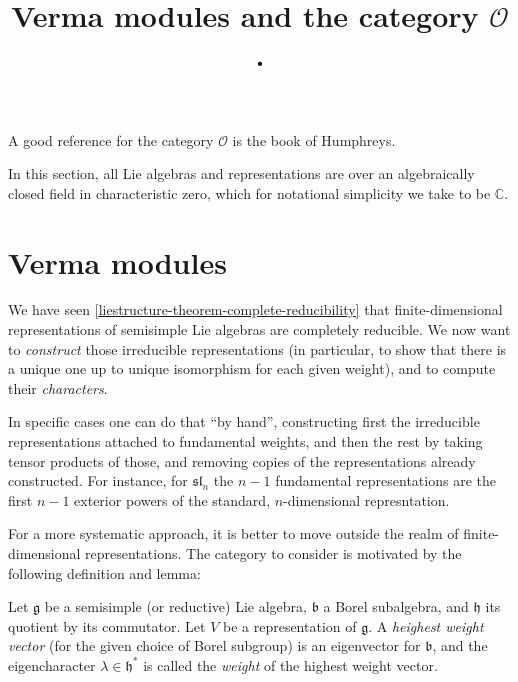 

%


\title{Verma modules and the category $\mathcal O$.}


\maketitle

\label{section-phantom}


\tableofcontents

A good reference for the category $\mathcal O$ is the book \cite{Humphreys-O} of Humphreys.


In this section, all Lie algebras and representations are over an algebraically closed field in characteristic zero, which for notational simplicity we take to be $\mathbb C$.


\section{Verma modules}
\label{section-Verma-modules}
We have seen \ref{liestructure-theorem-complete-reducibility} that finite-dimensional representations of semisimple Lie algebras are completely reducible. We now want to \emph{construct} those irreducible representations (in particular, to show that there is a unique one up to unique isomorphism for each given weight), and to compute their \emph{characters}.

In specific cases one can do that ``by hand'', constructing first the irreducible representations attached to fundamental weights, and then the rest by taking tensor products of those, and removing copies of the representations already constructed. For instance, for $\mathfrak{sl}_n$ the $n-1$ fundamental representations are the first $n-1$ exterior powers of the standard, $n$-dimensional represntation.

For a more systematic approach, it is better to move outside the realm of finite-dimensional representations. The category to consider is motivated by the following definition and lemma:
\begin{definition}
 \label{definition-highest-weight}
 Let $\mathfrak g$ be a semisimple (or reductive) Lie algebra, $\mathfrak b$ a Borel subalgebra, and $\mathfrak h$ its quotient by its commutator. Let $V$ be a representation of $\mathfrak g$. A {\it heighest weight vector} (for the given choice of Borel subgroup) is an eigenvector for $\mathfrak b$, and the eigencharacter $\lambda\in\mathfrak h^*$ is called the {\it weight} of the highest weight vector.
\end{definition}

